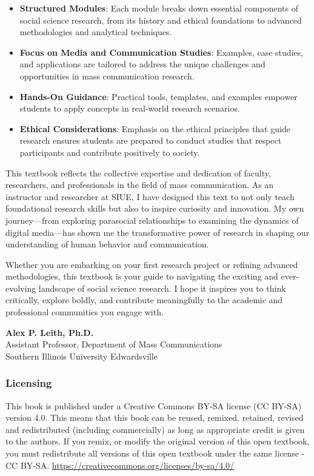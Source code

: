 \documentclass[
]{book}
\providecommand{\tightlist}{%
  \setlength{\itemsep}{0pt}\setlength{\parskip}{0pt}}
\begin{document}
\begin{itemize}
\tightlist
\item
  \textbf{Structured Modules}: Each module breaks down essential components of social science research, from its history and ethical foundations to advanced methodologies and analytical techniques.
\item
  \textbf{Focus on Media and Communication Studies}: Examples, case studies, and applications are tailored to address the unique challenges and opportunities in mass communication research.
\item
  \textbf{Hands-On Guidance}: Practical tools, templates, and examples empower students to apply concepts in real-world research scenarios.
\item
  \textbf{Ethical Considerations}: Emphasis on the ethical principles that guide research ensures students are prepared to conduct studies that respect participants and contribute positively to society.
\end{itemize}

This textbook reflects the collective expertise and dedication of faculty, researchers, and professionals in the field of mass communication. As an instructor and researcher at SIUE, I have designed this text to not only teach foundational research skills but also to inspire curiosity and innovation. My own journey---from exploring parasocial relationships to examining the dynamics of digital media---has shown me the transformative power of research in shaping our understanding of human behavior and communication.

Whether you are embarking on your first research project or refining advanced methodologies, this textbook is your guide to navigating the exciting and ever-evolving landscape of social science research. I hope it inspires you to think critically, explore boldly, and contribute meaningfully to the academic and professional communities you engage with.

\textbf{Alex P. Leith, Ph.D.}\\
Assistant Professor, Department of Mass Communications\\
Southern Illinois University Edwardsville

\subsubsection*{Licensing}\label{licensing}

This book is published under a Creative Commons BY-SA license (CC BY-SA) version 4.0. This means that this book can be reused, remixed, retained, revised and redistributed (including commercially) as long as appropriate credit is given to the authors. If you remix, or modify the original version of this open textbook, you must redistribute all versions of this open textbook under the same license - CC BY-SA. \url{https://creativecommons.org/licenses/by-sa/4.0/}
\end{document}
